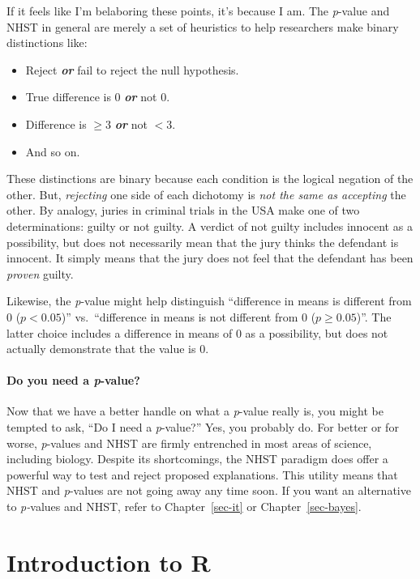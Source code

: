 \documentclass[
  13,
  letterpaper,
]{report}
\providecommand{\tightlist}{%
  \setlength{\itemsep}{0pt}\setlength{\parskip}{0pt}}
\begin{document}
If it feels like I'm belaboring these points, it's because I am. The
\emph{p}-value and NHST in general are merely a set of heuristics to
help researchers make binary distinctions like:

\begin{itemize}
\tightlist
\item
  Reject \textbf{\emph{or}} fail to reject the null hypothesis.
\item
  True difference is 0 \textbf{\emph{or}} not 0.
\item
  Difference is \(\ge3\) \textbf{\emph{or}} not \(<3\).
\item
  And so on.
\end{itemize}

These distinctions are binary because each condition is the logical
negation of the other. But, \emph{rejecting} one side of each dichotomy
is \emph{not the same as accepting} the other. By analogy, juries in
criminal trials in the USA make one of two determinations: guilty or not
guilty. A verdict of not guilty includes innocent as a possibility, but
does not necessarily mean that the jury thinks the defendant is
innocent. It simply means that the jury does not feel that the defendant
has been \emph{proven} guilty.

Likewise, the \emph{p}-value might help distinguish ``difference in
means is different from 0 (\(p<0.05\))'' vs.~``difference in means is
not different from 0 (\(p\ge0.05\))''. The latter choice includes a
difference in means of 0 as a possibility, but does not actually
demonstrate that the value is 0.

\subsection{\texorpdfstring{Do you need a
\emph{p}-value?}{Do you need a p-value?}}\label{do-you-need-a-p-value}

Now that we have a better handle on what a \emph{p}-value really is, you
might be tempted to ask, ``Do I need a \emph{p}-value?'' Yes, you
probably do. For better or for worse, \emph{p}-values and NHST are
firmly entrenched in most areas of science, including biology. Despite
its shortcomings, the NHST paradigm does offer a powerful way to test
and reject proposed explanations. This utility means that NHST and
\emph{p}-values are not going away any time soon. If you want an
alternative to \emph{p-}values and NHST, refer to Chapter~\ref{sec-it}
or Chapter~\ref{sec-bayes}.

\part{Introduction to R}
\end{document}
